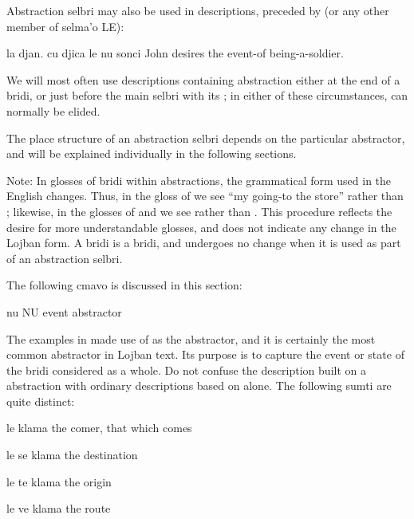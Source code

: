 Abstraction selbri may also be used in descriptions, preceded
    by  (or any other member of selma'o LE):
\begin{example}
la djan. cu djica le nu sonci \n
John desires the event-of being-a-soldier.
\end{example}

We will most often use descriptions containing abstraction
    either at the end of a bridi, or just before the main selbri
    with its ; in either of these circumstances,  can
    normally be elided.

The place structure of an abstraction selbri depends on the
    particular abstractor, and will be explained individually in
    the following sections.

Note: In glosses of bridi within abstractions, the
    grammatical form used in the English changes. Thus, in the
    gloss of  we see ``my going-to
    the store'' rather than ; likewise, in the
    glosses of  and  we see  rather
    than . This procedure reflects the desire for
    more understandable glosses, and does not indicate any change
    in the Lojban form. A bridi is a bridi, and undergoes no change
    when it is used as part of an abstraction selbri.



The following cmavo is discussed in this section:

   nu  NU  event abstractor

The examples in  made use of 
    as the abstractor, and it is certainly the most common
    abstractor in Lojban text. Its purpose is to capture the event
    or state of the bridi considered as a whole. Do not confuse the
     description built on a  abstraction with ordinary
    descriptions based on  alone. The following sumti are
    quite distinct:
\begin{example}
le klama\n
the comer, that which comes
\end{example}

\begin{example}
le se klama\n
the destination
\end{example}

\begin{example}
le te klama\n
the origin
\end{example}

\begin{example}
le ve klama\n
the route
\end{example}

